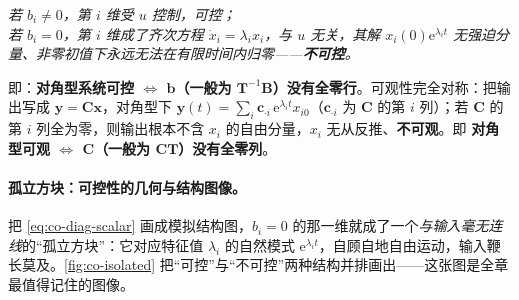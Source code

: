 \begin{center}\itshape
若 $b_i\neq 0$，第 $i$ 维受 $u$ 控制，可控；\\
若 $b_i=0$，第 $i$ 维成了齐次方程 $\dot{x}_i=\lambda_i x_i$，与 $u$ 无关，其解 $x_i(0)\mathrm{e}^{\lambda_i t}$ 无强迫分量、非零初值下永远无法在有限时间内归零——\textbf{不可控}。
\end{center}

\noindent 即：\textbf{对角型系统可控 $\iff$ $\mathbf{b}$（一般为 $\mathbf{T}^{-1}\mathbf{B}$）没有全零行}。可观性完全对称：把输出写成 $\mathbf{y}=\mathbf{C}\mathbf{x}$，对角型下 $\mathbf{y}(t)=\sum_i \mathbf{c}_{\cdot i}\,\mathrm{e}^{\lambda_i t}x_{i0}$（$\mathbf{c}_{\cdot i}$ 为 $\mathbf{C}$ 的第 $i$ 列）；若 $\mathbf{C}$ 的第 $i$ 列全为零，则输出根本不含 $x_i$ 的自由分量，$x_i$ 无从反推、\textbf{不可观}\cite{liubao2006modern}。即 \textbf{对角型可观 $\iff$ $\mathbf{C}$（一般为 $\mathbf{C}\mathbf{T}$）没有全零列}。

\paragraph{孤立方块：可控性的几何与结构图像。}
把 \cref{eq:co-diag-scalar} 画成模拟结构图，$b_i=0$ 的那一维就成了一个\emph{与输入毫无连线}的“孤立方块”：它对应特征值 $\lambda_i$ 的自然模式 $\mathrm{e}^{\lambda_i t}$，自顾自地自由运动，输入鞭长莫及。\cref{fig:co-isolated} 把“可控”与“不可控”两种结构并排画出——这张图是全章最值得记住的图像。

